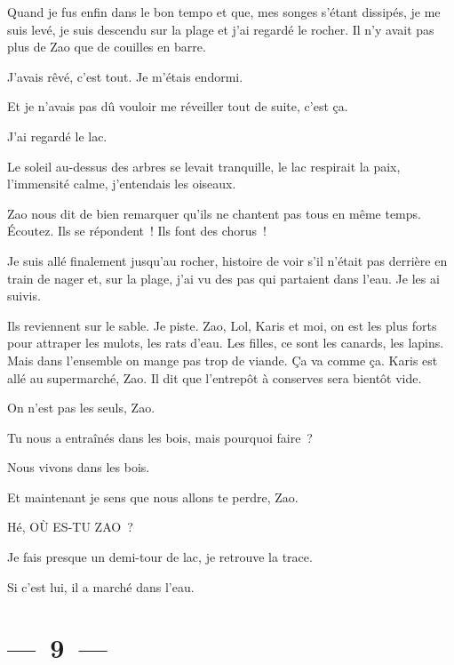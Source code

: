 \documentclass[french,twoside]{book} %
\begin{document}
\noindent Quand je fus enfin dans le bon tempo et que, mes songes s’étant dissipés, je me suis levé, je suis descendu sur la plage et j’ai regardé le rocher. Il n’y avait pas plus de Zao que de couilles en barre.\par
J’avais rêvé, c’est tout. Je m’étais endormi.\par
Et je n’avais pas dû vouloir me réveiller tout de suite, c’est ça.\par
J’ai regardé le lac.\par
Le soleil au-dessus des arbres se levait tranquille, le lac respirait la paix, l’immensité calme, j’entendais les oiseaux.\par
Zao nous dit de bien remarquer qu’ils ne chantent pas tous en même temps. Écoutez. Ils se répondent ! Ils font des chorus !\par
Je suis allé finalement jusqu’au rocher, histoire de voir s’il n’était pas derrière en train de nager et, sur la plage, j’ai vu des pas qui partaient dans l’eau. Je les ai suivis.\par
Ils reviennent sur le sable. Je piste. Zao, Lol, Karis et moi, on est les plus forts pour attraper les mulots, les rats d’eau. Les filles, ce sont les canards, les lapins. Mais dans l’ensemble on mange pas trop de viande. Ça va comme ça. Karis est allé au supermarché, Zao. Il dit que l’entrepôt à conserves sera bientôt vide.\par
On n’est pas les seuls, Zao.\par
Tu nous a entraînés dans les bois, mais pourquoi faire ?\par
Nous vivons dans les bois.\par
Et maintenant je sens que nous allons te perdre, Zao.\par
Hé, OÙ ES-TU ZAO ?\par
Je fais presque un demi-tour de lac, je retrouve la trace.\par
\bigbreak
Si c’est lui, il a marché dans l’eau.

\section[{— 9 —}]{— 9 —}
\renewcommand{\leftmark}{— 9 —}
\end{document}
